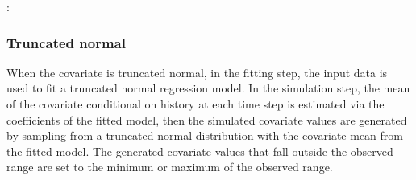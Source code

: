 \documentclass[letterpaper,10pt,english]{sphinxmanual}
\begin{document}
\begin{sphinxVerbatim}[commandchars=\\\{\}]
        
                  
               \PYG{p}{[} \PYG{p}{]}
               \PYG{p}{[} \PYG{p}{]}
               
               
\end{sphinxVerbatim}

\sphinxAtStartPar
{}:
\begin{quote}

\end{quote}


\subsubsection{Truncated normal}
\label{\detokenize{Specifications/Covariate models:truncated-normal}}
\sphinxAtStartPar
When the covariate is truncated normal, in the fitting step, the input data
is used to fit a truncated normal regression model. In the simulation step, the mean of the covariate conditional on history at each time step is estimated via the coefficients of the
fitted model, then the simulated covariate values are generated by sampling from a truncated normal
distribution with the covariate mean from the fitted model. The generated covariate values that fall outside the observed range
are set to the minimum or maximum of the observed range.
\end{document}
